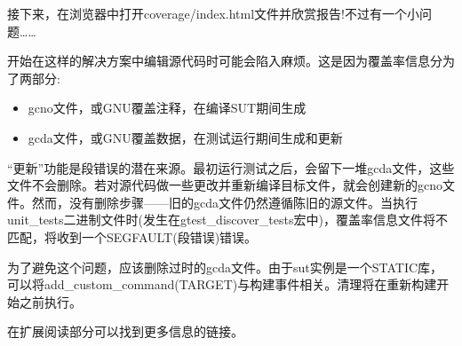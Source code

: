 接下来，在浏览器中打开coverage/index.html文件并欣赏报告!不过有一个小问题……



开始在这样的解决方案中编辑源代码时可能会陷入麻烦。这是因为覆盖率信息分为了两部分:

\begin{itemize}
\item 
gcno文件，或GNU覆盖注释，在编译SUT期间生成

\item 
gcda文件，或GNU覆盖数据，在测试运行期间生成和更新
\end{itemize}

“更新”功能是段错误的潜在来源。最初运行测试之后，会留下一堆gcda文件，这些文件不会删除。若对源代码做一些更改并重新编译目标文件，就会创建新的gcno文件。然而，没有删除步骤——旧的gcda文件仍然遵循陈旧的源文件。当执行unit\_tests二进制文件时(发生在gtest\_discover\_tests宏中)，覆盖率信息文件将不匹配，将收到一个SEGFAULT(段错误)错误。

为了避免这个问题，应该删除过时的gcda文件。由于sut实例是一个STATIC库，可以将add\_custom\_command(TARGET)与构建事件相关。清理将在重新构建开始之前执行。

在扩展阅读部分可以找到更多信息的链接。























































